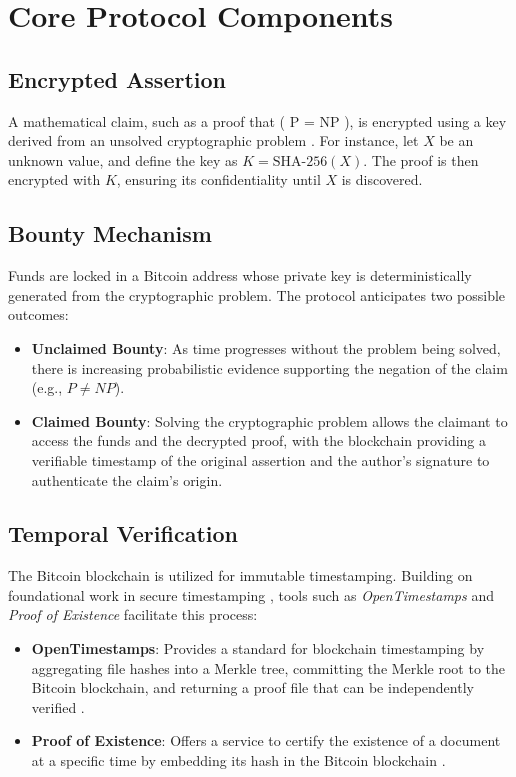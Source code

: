 \documentclass[12pt]{report}
\begin{document}
\section{Core Protocol Components}
\subsection{Encrypted Assertion}

A mathematical claim, such as a proof that ( P = NP ), is encrypted using a key derived from an unsolved cryptographic problem \cite{DiffieHellman1976}. For instance, let \( X \) be an unknown value, and define the key as \( K = \text{SHA-256}(X) \). The proof is then encrypted with \( K \), ensuring its confidentiality until \( X \) is discovered.

\subsection{Bounty Mechanism}

Funds are locked in a Bitcoin address whose private key is deterministically generated from the cryptographic problem. The protocol anticipates two possible outcomes:

\begin{itemize}
    \item \textbf{Unclaimed Bounty}: As time progresses without the problem being solved, there is increasing probabilistic evidence supporting the negation of the claim (e.g., \( P \neq NP \)).
    \item \textbf{Claimed Bounty}: Solving the cryptographic problem allows the claimant to access the funds and the decrypted proof, with the blockchain providing a verifiable timestamp of the original assertion and the author's signature to authenticate the claim's origin.
\end{itemize}

\subsection{Temporal Verification}
The Bitcoin blockchain \cite{Nakamoto2008} is utilized for immutable timestamping. Building on foundational work in secure timestamping \cite{HaberStornetta1991}, tools such as \textit{OpenTimestamps} and \textit{Proof of Existence} facilitate this process:

\begin{itemize}
    \item \textbf{OpenTimestamps}: Provides a standard for blockchain timestamping by aggregating file hashes into a Merkle tree, committing the Merkle root to the Bitcoin blockchain, and returning a proof file that can be independently verified \cite{opentimestamps}.
    \item \textbf{Proof of Existence}: Offers a service to certify the existence of a document at a specific time by embedding its hash in the Bitcoin blockchain \cite{proofofexistence}.
\end{itemize}
\end{document}
